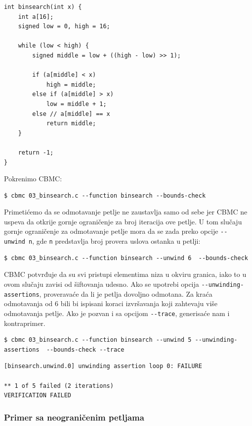 \begin{verbatim}
int binsearch(int x) {
    int a[16];
    signed low = 0, high = 16;

    while (low < high) {
        signed middle = low + ((high - low) >> 1);

        if (a[middle] < x)
            high = middle;
        else if (a[middle] > x)
            low = middle + 1;
        else // a[middle] == x
            return middle;
    }

    return -1;
}
\end{verbatim}

Pokrenimo CBMC:

\begin{verbatim}
$ cbmc 03_binsearch.c --function binsearch --bounds-check
\end{verbatim}

Primetićemo da se odmotavanje petlje ne zaustavlja samo od sebe jer CBMC ne uspeva da otkrije gornje ograničenje za broj iteracija ove petlje. U tom slučaju gornje ograničenje za odmotavanje petlje mora da se zada preko opcije \texttt{-{}-unwind\ n}, gde \texttt{n} predstavlja broj provera uslova ostanka u petlji:

\begin{verbatim}
$ cbmc 03_binsearch.c --function binsearch --unwind 6  --bounds-check
\end{verbatim}

CBMC potvrđuje da su svi pristupi elementima niza u okviru granica, iako to u ovom slučaju zavisi od šiftovanja udesno. Ako se upotrebi opcija \texttt{-{}-unwinding-assertions}, proveravaće da li je petlja dovoljno odmotana. Za kraća odmotavanja od 6 bili bi ispisani koraci izvršavanja koji zahtevaju više odmotavanja petlje. Ako je pozvan i sa opcijom \texttt{-{}-trace}, generisaće nam i kontraprimer.

\begin{verbatim}
$ cbmc 03_binsearch.c --function binsearch --unwind 5 --unwinding-assertions  --bounds-check --trace
\end{verbatim}

\begin{verbatim}
[binsearch.unwind.0] unwinding assertion loop 0: FAILURE

** 1 of 5 failed (2 iterations)
VERIFICATION FAILED
\end{verbatim}

\subsubsection{Primer sa neograničenim petljama}\label{primer-sa-neograniux10denim-petljama}

